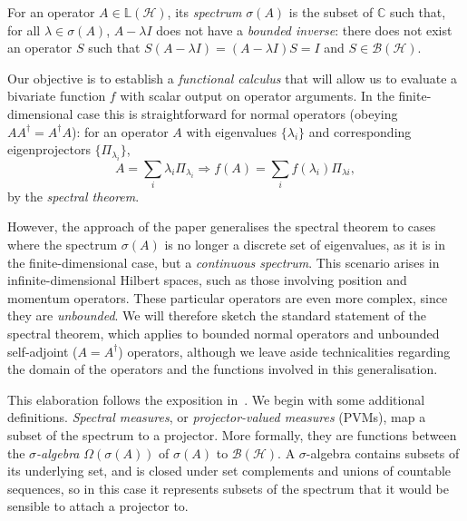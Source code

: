 \documentclass[10pt, a4paper]{article}
\numberwithin{equation}{section} %
\theoremstyle{definition}
\theoremstyle{plain}
\newcommand{\?}{\mathrel{?}} %
\newcommand{\C}{\mathbb{C}} %
\newcommand{\Lin}[1]{\mathbb{L}\left(#1\right)}
\newcommand{\Hs}{\mathcal{H}} %
\begin{document}
\begin{appendices}
                          For an operator \(A \in \Lin{\Hs}\), its \emph{spectrum} \(\sigma(A)\) is the subset of \(\C\) such that, for all \(\lambda \in \sigma(A)\), \(A - \lambda I\) does not have a \emph{bounded inverse}: there does not exist an operator \(S\) such that \(S\left( A - \lambda I \right) = \left( A - \lambda I \right)S =  I\) and \(S \in \mathcal{B}(\Hs)\).

                          Our objective is to establish a \emph{functional calculus} that will allow us to evaluate a bivariate function  \(f\) with scalar output on operator arguments. In the finite-dimensional case this is straightforward for normal operators (obeying \(AA^{\dagger} = A^{\dagger}A\)): for an operator \(A\) with eigenvalues \(\{\lambda_i\}\) and corresponding eigenprojectors \(\{\Pi_{\lambda_i}\}\),
                          \[ A = \sum_i \lambda_i \Pi_{\lambda_i} \Rightarrow f(A) = \sum_i f(\lambda_{i}) \Pi_{\lambda{i}}, \]
                          by the \emph{spectral theorem}.

                          However, the approach of the paper generalises the spectral theorem to cases where the spectrum \(\sigma(A)\) is no longer a discrete set of eigenvalues, as it is in the finite-dimensional case, but a \emph{continuous spectrum}. This scenario arises in infinite-dimensional Hilbert spaces, such as those involving position and momentum operators. These particular operators are even more complex, since they are \emph{unbounded}. We will therefore sketch the standard statement of the spectral theorem, which applies to bounded normal operators and unbounded self-adjoint (\(A = A^{\dagger}\)) operators, although we leave aside technicalities regarding the domain of the operators and the functions involved in this generalisation.

                          This elaboration follows the exposition in~\cite{HallQuantumForMath}. We begin with some additional definitions. \emph{Spectral measures}, or \emph{projector-valued measures} (PVMs), map a subset of the spectrum to a projector. More formally, they are functions between the \emph{\(\sigma\)-algebra} \(\Omega(\sigma(A))\) of \(\sigma(A)\) to \(\mathcal{B}(\Hs)\). A \(\sigma\)-algebra contains subsets of its underlying set, and is closed under set complements and unions of countable sequences, so in this case it represents subsets of the spectrum that it would be sensible to attach a projector to.


\end{appendices}
\end{document}
